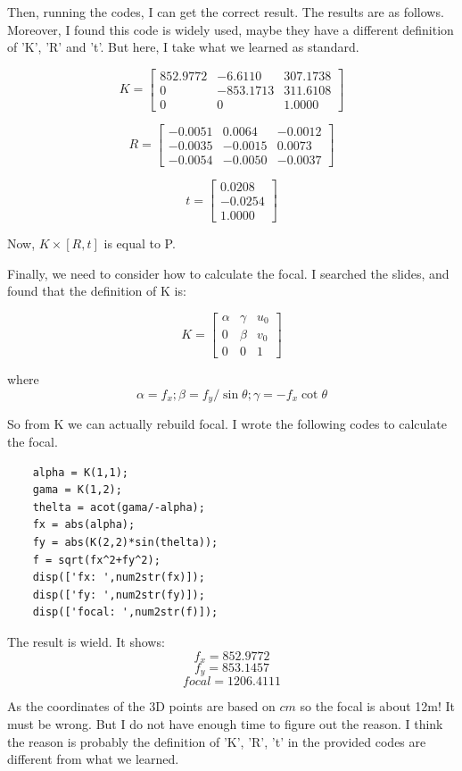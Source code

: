\documentclass{article}
\begin{document}
Then, running the codes, I can get the correct result. The results are as follows. Moreover, I found this code is widely used, maybe they have a different definition of 'K', 'R' and 't'. But here, I take what we learned as standard.

$$K = \left[ \begin{array}{ccc} 852.9772 & -6.6110 & 307.1738 \\ 0 & -853.1713 & 311.6108 \\ 0 & 0 & 1.0000 \end{array} \right] $$

$$R = \left[ \begin{array}{ccc} -0.0051 & 0.0064 & -0.0012 \\ -0.0035 & -0.0015 & 0.0073\\ -0.0054 & -0.0050 & -0.0037 \end{array} \right] $$

$$t = \left[ \begin{array}{c} 0.0208 \\ -0.0254 \\ 1.0000 \end{array} \right] $$

Now, $K\times [R, t]$ is equal to P.

Finally, we need to consider how to calculate the focal. I searched the slides, and found that the definition of K is:

$$K = \left[ \begin{array}{ccc} \alpha & \gamma & u_0 \\ 0 & \beta & v_0 \\ 0 & 0 & 1 \end{array} \right] $$

where 
$$\alpha = f_x; \beta = f_y/\sin{\theta}; \gamma = -f_x\cot{\theta}$$

So from K we can actually rebuild focal. I wrote the following codes to calculate the focal.

\begin{lstlisting}
    alpha = K(1,1);
    gama = K(1,2);
    thelta = acot(gama/-alpha);
    fx = abs(alpha);
    fy = abs(K(2,2)*sin(thelta));
    f = sqrt(fx^2+fy^2);
    disp(['fx: ',num2str(fx)]);
    disp(['fy: ',num2str(fy)]);
    disp(['focal: ',num2str(f)]);
\end{lstlisting}

The result is wield. It shows:
$$f_x = 852.9772$$
$$f_y = 853.1457$$
$$focal = 1206.4111$$

As the coordinates of the 3D points are based on $cm$ so the focal is about 12m! It must be wrong. But I do not have enough time to figure out the reason. I think the reason is probably the definition of 'K', 'R', 't' in the provided codes are different from what we learned.
\end{document}
